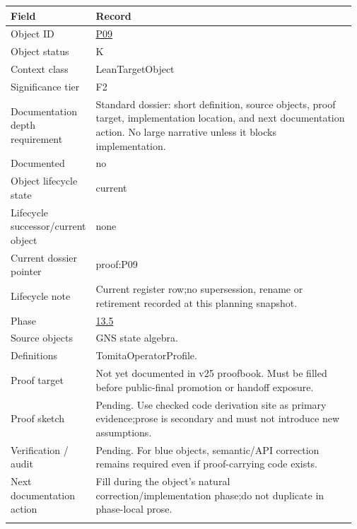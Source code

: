 \begin{longtable}{L{0.16\linewidth} L{0.81\linewidth}}
\hline
\textbf{Field} & \textbf{Record}\\
\hline
Object ID & \hyperlink{object-row-P09}{P09}\\
\hline\addlinespace[0.20em]
Object status & K\\
\hline\addlinespace[0.20em]
Context class & LeanTargetObject\\
\hline\addlinespace[0.20em]
Significance tier & F2\\
\hline\addlinespace[0.20em]
Documentation depth requirement & Standard dossier: short definition, source objects, proof target, implementation location, and next documentation action. No large narrative unless it blocks implementation.\\
\hline\addlinespace[0.20em]
Documented & no\\
\hline\addlinespace[0.20em]
Object lifecycle state & current\\
\hline\addlinespace[0.20em]
Lifecycle successor/\allowbreak{}current object & none\\
\hline\addlinespace[0.20em]
Current dossier pointer & proof:P09\\
\hline\addlinespace[0.20em]
Lifecycle note & Current register row;\newline no supersession, rename or retirement recorded at this planning snapshot.\\
\hline\addlinespace[0.20em]
Phase & \hyperlink{phase-row-13-5}{13.5}\\
\hline\addlinespace[0.20em]
Source objects & GNS state algebra.\\
\hline\addlinespace[0.20em]
Definitions & TomitaOperatorProfile.\\
\hline\addlinespace[0.20em]
Proof target & Not yet documented in v25 proofbook. Must be filled before public-final promotion or handoff exposure.\\
\hline\addlinespace[0.20em]
Proof sketch & Pending. Use checked code derivation site as primary evidence;\newline prose is secondary and must not introduce new assumptions.\\
\hline\addlinespace[0.20em]
Verification /\allowbreak{} audit & Pending. For blue objects, semantic/\allowbreak{}API correction remains required even if proof-carrying code exists.\\
\hline\addlinespace[0.20em]
Next documentation action & Fill during the object's natural correction/\allowbreak{}implementation phase;\newline do not duplicate in phase-local prose.\\
\hline\addlinespace[0.20em]
\end{longtable}
